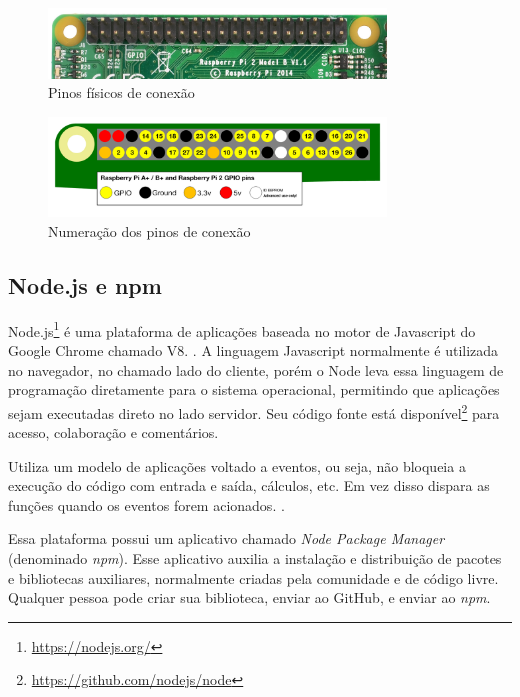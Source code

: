 \begin{figure}[htb]
	\caption{\label{fig:gpio-pins-pi2}Pinos físicos de conexão}
	\begin{center}
		\includegraphics[width=0.8\textwidth]{img/gpio-pins-pi2.jpg}
	\end{center}
\end{figure}

\begin{figure}[htb]
	\caption{\label{fig:gpio-numbers-pi2}Numeração dos pinos de conexão}
	\begin{center}
		\includegraphics[width=0.8\textwidth]{img/gpio-numbers-pi2.png}
	\end{center}
\end{figure}


\subsection{Node.js e npm}\label{sec:node-js}

Node.js\footnote{\url{https://nodejs.org/}} é uma plataforma de aplicações baseada no motor de Javascript do Google Chrome chamado V8. \cite{o-que-e-node}. A linguagem Javascript normalmente é utilizada no navegador, no chamado lado do cliente, porém o Node leva essa linguagem de programação diretamente para o sistema operacional, permitindo que aplicações sejam executadas direto no lado servidor. Seu código fonte está disponível\footnote{\url{https://github.com/nodejs/node}} para acesso, colaboração e comentários.

Utiliza um modelo de aplicações voltado a eventos, ou seja, não bloqueia a execução do código com entrada e saída, cálculos, etc. Em vez disso dispara as funções quando os eventos forem acionados. \cite{o-que-e-node}.

Essa plataforma possui um aplicativo chamado \textit{Node Package Manager} (denominado \textit{npm}). Esse aplicativo auxilia a instalação e distribuição de pacotes e bibliotecas auxiliares, normalmente criadas pela comunidade e de código livre. Qualquer pessoa pode criar sua biblioteca, enviar ao GitHub, e enviar ao \textit{npm}.

